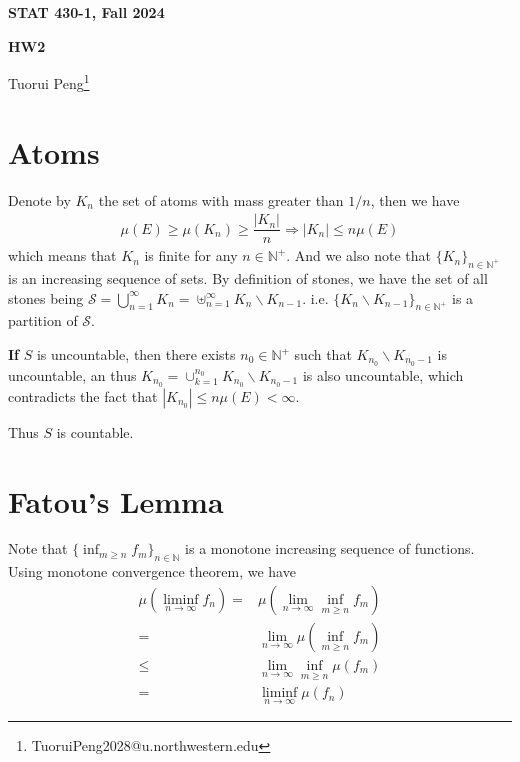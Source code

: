 \documentclass[11pt,a4paper]{article}
\numberwithin{equation}{section}%
\begin{document}
\begin{center}\thispagestyle{plain}

{\LARGE\textbf{STAT 430-1, Fall 2024}}

{\Large\textbf{HW2}}

Tuorui Peng\footnote{TuoruiPeng2028@u.northwestern.edu}
\end{center}

\thispagestyle{myheadings}
\pagestyle{myheadings}

\setcounter{tocdepth}{1}
\tableofcontents


  

\section{Atoms}


Denote by $ K_n $ the set of atoms with mass greater than $ 1/n $, then we have
\begin{align*}
     \mu (E)  \geq \mu (K_n) \geq \dfrac{ \left\vert K_n \right\vert  }{ n }  \Rightarrow \left\vert K_n \right\vert\leq n\mu (E)
\end{align*}
which means that $ K_n $ is finite for any $ n\in\mathbb{N}^+ $. And we also note that $ \{K_n\}_{n\in\mathbb{N}^+} $ is an increasing sequence of sets. By definition of stones, we have the set of all stones being $ \mathcal{S}=\bigcup_{n=1}^{\infty}K_n = \uplus_{n=1}^{\infty}K_n\backslash K_{n-1} $. i.e. $ \{K_n\backslash K_{n-1}\}_{n\in\mathbb{N}^+} $ is a partition of $ \mathcal{S} $.

\textbf{If} $ S $ is uncountable, then there exists $ n_0\in\mathbb{N}^+ $ such that $ K_{n_0}\backslash K_{n_0-1} $ is uncountable, an thus $ K_{n_0} = \cup_{k=1}^{n_0} K_{n_0}\backslash K_{n_0-1} $ is also uncountable, which contradicts the fact that $ \left\vert K_{n_0} \right\vert \leq n \mu (E) <\infty $.

Thus $ S $ is countable.


\section{Fatou's Lemma}

Note that $ \{\inf_{m\geq n}f_m\}_{n\in\mathbb{N}} $ is a monotone increasing sequence of functions. Using monotone convergence theorem, we have
\begin{align*}
    \mu \left(\mathop{ \lim\inf }\limits_{n\to\infty } f_n \right)  = & \mu \left( \mathop{ \lim }\limits_{n\to\infty } \inf_{m\geq n} f_m \right)\\
    = & \lim_{n\to\infty } \mu \left( \inf_{m\geq n} f_m \right)\\
    \leq & \lim_{n\to\infty } \inf_{m\geq n} \mu (f_m)\\
    = & \mathop{ \lim\inf  }\limits_{n\to\infty} \mu (f_n) 
\end{align*}
\end{document}
